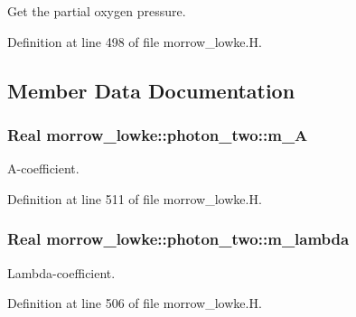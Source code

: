 Get the partial oxygen pressure. 



Definition at line 498 of file morrow\+\_\+lowke.\+H.



\subsection{Member Data Documentation}
\subsubsection[{\texorpdfstring{m\+\_\+A}{m_A}}]{\setlength{\rightskip}{0pt plus 5cm}Real morrow\+\_\+lowke\+::photon\+\_\+two\+::m\+\_\+A\hspace{0.3cm}{\ttfamily [protected]}}\hypertarget{classmorrow__lowke_1_1photon__two_a27c3515015a25b90609de0f8ddc3a5b0}{}\label{classmorrow__lowke_1_1photon__two_a27c3515015a25b90609de0f8ddc3a5b0}


A-\/coefficient. 



Definition at line 511 of file morrow\+\_\+lowke.\+H.

\subsubsection[{\texorpdfstring{m\+\_\+lambda}{m_lambda}}]{\setlength{\rightskip}{0pt plus 5cm}Real morrow\+\_\+lowke\+::photon\+\_\+two\+::m\+\_\+lambda\hspace{0.3cm}{\ttfamily [protected]}}\hypertarget{classmorrow__lowke_1_1photon__two_aa5a3cf38f0f15dbe6ac8c62e7630a419}{}\label{classmorrow__lowke_1_1photon__two_aa5a3cf38f0f15dbe6ac8c62e7630a419}


Lambda-\/coefficient. 



Definition at line 506 of file morrow\+\_\+lowke.\+H.

